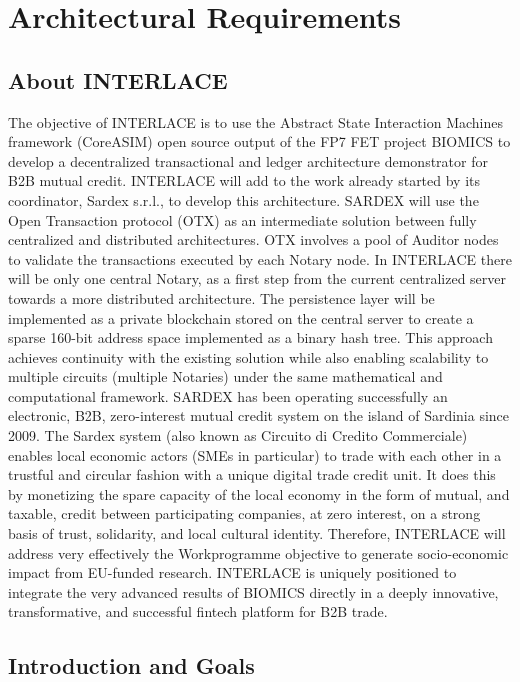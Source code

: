 \chapter{Architectural Requirements}
\label{ch:archreq}
\section{\textbf{About INTERLACE}}

The objective of INTERLACE is to use the Abstract State Interaction Machines framework (CoreASIM) open source output of
the FP7 FET project BIOMICS to develop a decentralized transactional and ledger architecture demonstrator for B2B mutual
credit. INTERLACE will add to the work already started by its coordinator, Sardex s.r.l., to develop this architecture.
SARDEX will use the Open Transaction protocol (OTX) as an intermediate solution between fully centralized and distributed
architectures. OTX involves a pool of Auditor nodes to validate the transactions executed by each Notary node. In
INTERLACE there will be only one central Notary, as a first step from the current centralized server towards a more
distributed architecture. The persistence layer will be implemented as a private blockchain stored on the central server to
create a sparse 160-bit address space implemented as a binary hash tree. This approach achieves continuity with the
existing solution while also enabling scalability to multiple circuits (multiple Notaries) under the same mathematical and
computational framework. SARDEX has been operating successfully an electronic, B2B, zero-interest mutual credit system
on the island of Sardinia since 2009. The Sardex system (also known as Circuito di Credito Commerciale) enables local
economic actors (SMEs in particular) to trade with each other in a trustful and circular fashion with a unique digital trade
credit unit. It does this by monetizing the spare capacity of the local economy in the form of mutual, and taxable, credit
between participating companies, at zero interest, on a strong basis of trust, solidarity, and local cultural identity. Therefore,
INTERLACE will address very effectively the Workprogramme objective to generate socio-economic impact from EU-funded
research. INTERLACE is uniquely positioned to integrate the very advanced results of BIOMICS directly in a deeply
innovative, transformative, and successful fintech platform for B2B trade.

\section{Introduction and Goals}\label{section-introduction-and-goals}


